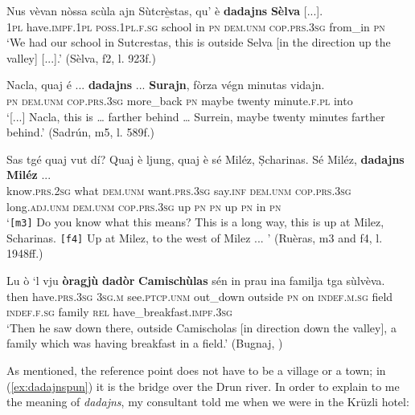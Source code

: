 \ea
\label{ex:dad3}
\gll Nus vèvan nòssa scùla ajn Sùtcrè̱stas, qu’ è \textbf{dadajns} \textbf{Sèlva} [...]. \\
\textsc{1pl} have.\textsc{impf.1pl} \textsc{poss.1pl.f.sg} school in \textsc{pn} \textsc{dem.unm} \textsc{cop.prs.3sg} from\_in \textsc{pn}\\
\glt `We had our school in Sutcrestas, this is outside Selva [in the direction up the valley] [...].' (Sèlva, f2, l. 923f.)
\z

\ea
\label{ex:dad4}
\gll [...] Nacla, quaj é ... \textbf{dadajns} ... \textbf{Surajn}, fòrza végn minutas vidajn.\\
{} \textsc{pn} \textsc{dem.unm} \textsc{cop.prs.3sg} {} more\_back {} \textsc{pn} maybe twenty minute.\textsc{f.pl} into\\
\glt `[...] Nacla, this is … farther behind … Surrein, maybe twenty minutes farther behind.' (Sadrún, m5, l. 589f.)
\z

\ea
\label{ex:dad5}
\gll {}\cb {} Sas tgé quaj vut dí? Quaj è ljung, quaj è sé Miléz, Ṣcharinas. \cb {} Sé Miléz, \textbf{dadajns} \textbf{Miléz} ... \\ 
{} know.\textsc{prs.2sg} what \textsc{dem.unm} want.\textsc{prs.3sg} say.\textsc{inf} \textsc{dem.unm} \textsc{cop.prs.3sg} long.\textsc{adj.unm} \textsc{dem.unm} \textsc{cop.prs.3sg} up \textsc{pn} \textsc{pn} {} up \textsc{pn} in \textsc{pn}\\
\glt  `\texttt{[m3]} Do you know what this means? This is a long way, this is up at Milez, Scharinas. \texttt{[f4]} Up at Milez, to the west of Milez ... ' (Ruèras, m3 and f4, l. 1948ff.)
\z

\ea
\label{ex:dad6}
\gll Lu ò ‘l vju \textbf{òragjù} \textbf{dadòr} \textbf{Camischùlas} sén in prau ina familja tga sùlvèva.\\
then have.\textsc{prs.3sg} \textsc{3sg.m} see.\textsc{ptcp.unm} out\_down outside \textsc{pn} on \textsc{indef.m.sg} field \textsc{indef.f.sg} family \textsc{rel} have\_breakfast.\textsc{impf.3sg}\\
\glt `Then he saw down there, outside Camischolas [in direction down the valley], a family which was having breakfast in a field.' (Bugnaj, \citealt[139]{Büchli1966})
\z

As mentioned, the reference point does not have to be a village or a town; in (\ref{ex:dadajnspun}) it is the bridge over the Drun river. In order to explain to me the meaning of \textit{dadajns}, my consultant told me when we were in the Krüzli hotel:

